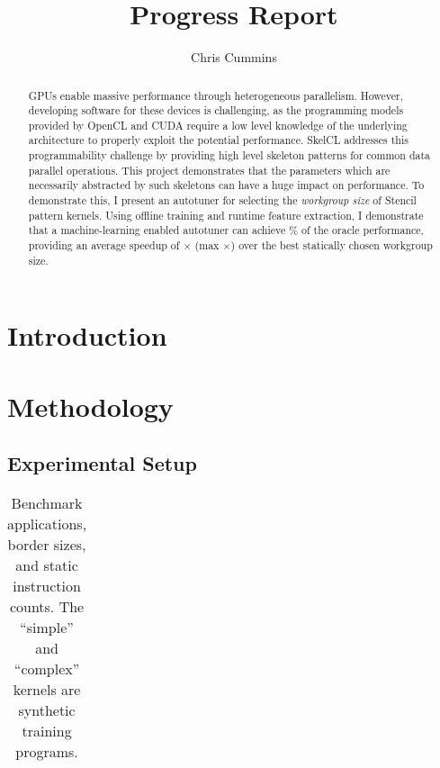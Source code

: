 
\title{Progress Report}

\author{Chris Cummins}





\maketitle

\begin{abstract}
  \noindent
  GPUs enable massive performance through heterogeneous
  parallelism. However, developing software for these devices is
  challenging, as the programming models provided by OpenCL and CUDA
  require a low level knowledge of the underlying architecture to
  properly exploit the potential performance. SkelCL addresses this
  programmability challenge by providing high level skeleton patterns
  for common data parallel operations. This project demonstrates that
  the parameters which are necessarily abstracted by such skeletons
  can have a huge impact on performance. To demonstrate this, I
  present an autotuner for selecting the \emph{workgroup size} of
  Stencil pattern kernels. Using offline training and runtime feature
  extraction, I demonstrate that a machine-learning enabled autotuner
  can achieve \% of the oracle performance, providing an
  average speedup of $\times$ (max $\times$) over
  the best statically chosen workgroup size.
\end{abstract}

\section{Introduction}

\section{Methodology}


\subsection{Experimental Setup}

\begin{table}
\footnotesize
\centering
\begin{tabular}{| l | l | l | l | l | l |}
\hline

\hline
\end{tabular}
\caption{%
  Benchmark applications, border sizes, and static instruction counts.
  The ``simple'' and ``complex'' kernels are synthetic training
  programs. %
}
\label{tab:hw}
\end{table}

